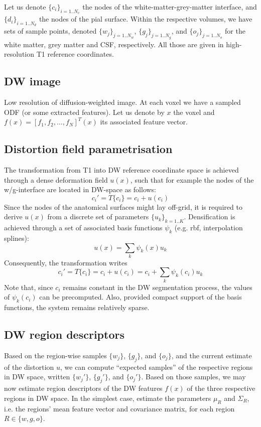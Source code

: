 \documentclass[a4paper,12pt]{article}
\begin{document}
Let us denote $\{c_i\}_{i=1..N_c}$ the nodes of the white-matter-grey-matter interface, and $\{d_i\}_{i=1..N_d}$ the nodes of the pial surface. Within the respective volumes, we have sets of sample points, denoted $\{w_j\}_{j=1..N_w}$, $\{g_j\}_{j=1..N_g}$, and $\{o_j\}_{j=1..N_o}$ for the white matter, grey matter and CSF, respectively. All those are given in high-resolution T1 reference coordinates.



\subsection{DW image}
Low resolution of diffusion-weighted image. At each voxel we have a sampled ODF (or some extracted features).
Let us denote by $x$ the voxel and $f(x) = [ f_1, f_2, \ldots, f_N]^T(x)$ its associated feature vector.


\subsection{Distortion field parametrisation}
The transformation from T1 into DW reference coordinate space is achieved through a dense deformation field $u(x)$, such that for example the nodes of the w/g-interface are located in DW-space as follows:
\begin{equation}
c_i' = T\{c_i\} = c_i + u(c_i)
\end{equation} 
Since the nodes of the anatomical surfaces might lay off-grid, it is required to derive $u(x)$ from a discrete set of parameters $\{u_k\}_{k=1..K}$. Densification is achieved through a set of associated basis functions $\psi_k$ (e.g. rbf, interpolation splines):
\begin{equation}
u(x) = \sum_k \psi_k(x) u_k
\end{equation}
Consequently, the transformation writes
\begin{equation}
c_i' = T\{c_i\} = c_i + u(c_i) = c_i + \sum_k \psi_k(c_i)u_k
\end{equation} 
Note that, since $c_i$ remains constant in the DW segmentation process, the values of $\psi_k(c_i)$ can be precomputed. Also, provided compact support of the basis functions, the system remains relatively sparse.

\subsection{DW region descriptors}
Based on the region-wise samples $\{w_j\}$, $\{g_j\}$, and $\{o_j\}$, and the current estimate of the distortion $u$, we can compute ``expected samples'' of the respective regions in DW space, written $\{w_j'\}$, $\{g_j'\}$, and $\{o_j'\}$. Based on those samples, we may now estimate region descriptors of the DW features $f(x)$ of the three respective regions in DW space. In the simplest case, estimate the parameters $\mu_R$ and $\Sigma_R$, i.e. the regions' mean feature vector and covariance matrix, for each region $R\in \{w,g,o\}$.
\end{document}
